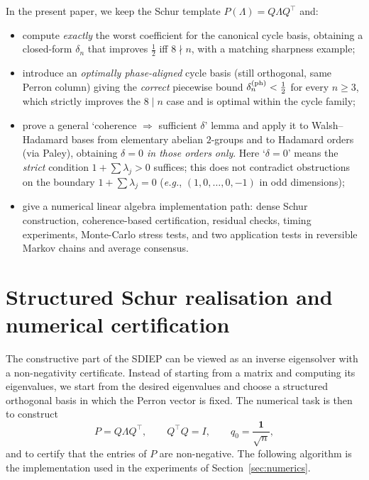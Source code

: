 \documentclass[12pt,fleqn]{amsart}
\renewcommand{\ge}{\geqslant}
\theoremstyle{definition}
\theoremstyle{remark}
\newcommand{\1}{\mathbf{1}}
\newcommand{\Lam}{\Lambda}
\begin{document}
\medskip
In the present paper, we keep the Schur template $P(\Lam)=Q\Lam Q^\top$ and:
\begin{itemize}
\item compute \emph{exactly} the worst coefficient for the canonical cycle basis, obtaining a closed-form $\delta_n$ that improves $\tfrac12$ iff $8\nmid n$, with a matching sharpness example;
\item introduce an \emph{optimally phase-aligned} cycle basis (still orthogonal, same Perron column) giving the \emph{correct} piecewise bound $\delta_n^{\rm (ph)}<\tfrac12$ for every $n\ge3$, which strictly improves the $8\mid n$ case and is optimal within the cycle family;
\item prove a general `coherence $\Rightarrow$ sufficient $\delta$' lemma and apply it to Walsh--Hadamard bases from elementary abelian $2$-groups and to Hadamard orders (via Paley), obtaining \emph{$\delta=0$ in those orders only}. Here `$\delta=0$' means the \emph{strict} condition $1+\sum\lambda_j>0$ suffices; this does not contradict obstructions on the boundary $1+\sum\lambda_j=0$ (\emph{e.g.}, $(1,0,\dots,0,-1)$ in odd dimensions);
\item give a numerical linear algebra implementation path: dense Schur construction, coherence-based certification, residual checks, timing experiments, Monte-Carlo stress tests, and two application tests in reversible Markov chains and average consensus.
\end{itemize}


\section{Structured Schur realisation and numerical certification}\label{sec:algorithms}

The constructive part of the SDIEP can be viewed as an inverse eigensolver with a non-negativity certificate.  Instead of starting from a matrix and computing its eigenvalues, we start from the desired eigenvalues and choose a structured orthogonal basis in which the Perron vector is fixed.  The numerical task is then to construct
\[
        P=Q\Lambda Q^{\top},\qquad Q^{\top}Q=I,
        \qquad q_0=\frac{\mathbf 1}{\sqrt n},
\]
and to certify that the entries of $P$ are non-negative.  The following algorithm is the implementation used in the experiments of Section~\ref{sec:numerics}.
\end{document}
